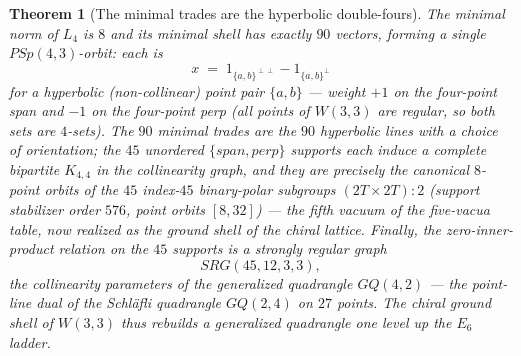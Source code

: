 \documentclass[12pt,a4paper]{article}
\def\mathrm#1{#1}%
\def\mathbf#1{#1}%
\newtheorem{theorem}{Theorem}[section]
\theoremstyle{definition}
\newcommand{\GQ}{\mathrm{GQ}}
\begin{document}
\begin{theorem}[The minimal trades are the hyperbolic double-fours]
\label{thm:minimal-trades}
The minimal norm of $L_4$ is $8$ and its minimal shell has exactly $90$
vectors, forming a single $\mathrm{PSp}(4,3)$-orbit: each is
\[
  x \;=\; \mathbf 1_{\{a,b\}^{\perp\perp}}-\mathbf 1_{\{a,b\}^{\perp}}
\]
for a hyperbolic (non-collinear) point pair $\{a,b\}$ --- weight $+1$ on the
four-point \emph{span} and $-1$ on the four-point \emph{perp} (all points of
$W(3,3)$ are regular, so both sets are $4$-sets). The $90$ minimal trades are
the $90$ hyperbolic lines with a choice of orientation; the $45$ unordered
$\{\mathrm{span},\mathrm{perp}\}$ supports each induce a complete bipartite
$K_{4,4}$ in the collinearity graph, and they are precisely the canonical
$8$-point orbits of the $45$ index-$45$ \emph{binary-polar} subgroups
$(2T\times 2T){:}2$ (support stabilizer order $576$, point orbits $[8,32]$)
--- the fifth vacuum of the five-vacua table, now realized as the ground
shell of the chiral lattice. Finally, the zero-inner-product relation on the
$45$ supports is a strongly regular graph
\[
  \mathrm{SRG}(45,12,3,3),
\]
the collinearity parameters of the generalized quadrangle $\GQ(4,2)$ --- the
point-line dual of the Schl\"afli quadrangle $\GQ(2,4)$ on $27$ points. The
chiral ground shell of $W(3,3)$ thus rebuilds a generalized quadrangle one
level up the $E_6$ ladder.
\end{theorem}
\end{document}
